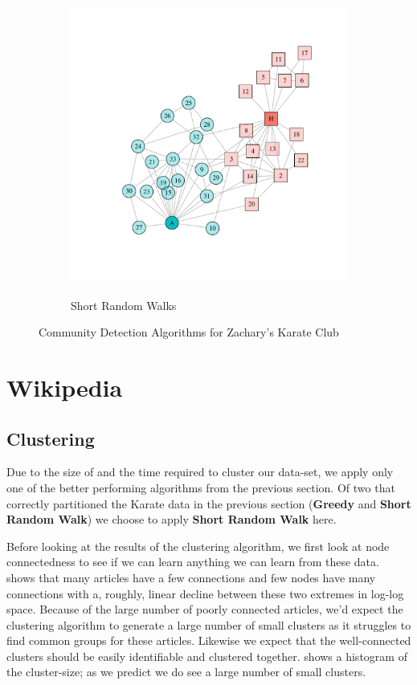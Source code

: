 \begin{figure}
\begin{subfigure}[b]{0.32\textwidth}
\label{fig:spinglass}
\end{subfigure}
\hfill
\begin{subfigure}[b]{0.32\textwidth}
\caption{Short Random Walks}
\includegraphics[width=\textwidth,trim={0.75in 0.75in 0.75in 0.75in}, clip=True]{walktrap.pdf}
\label{fig:walktrap}
\end{subfigure}
\caption{Community Detection Algorithms for Zachary's Karate Club}
\end{figure}

\section{Wikipedia}
\subsection{Clustering}
Due to the size of and the time required to cluster our data-set, we apply only one of the better performing algorithms from the previous section.  Of two that correctly partitioned the Karate data in the previous section (\textbf{Greedy} and \textbf{Short Random Walk}) we choose to apply \textbf{Short Random Walk} here.

Before looking at the results of the clustering algorithm, we first look at node connectedness to see if we can learn anything we can learn from these data.   shows that many articles have a few connections and few nodes have many connections with a, roughly, linear decline between these two extremes in log-log space.  Because of the large number of poorly connected articles, we'd expect the clustering algorithm to generate a large number of small clusters as it struggles to find common groups for these articles.  Likewise we expect that the well-connected clusters should be easily identifiable and clustered together.   shows a histogram of the cluster-size; as we predict we do see a large number of small clusters.

